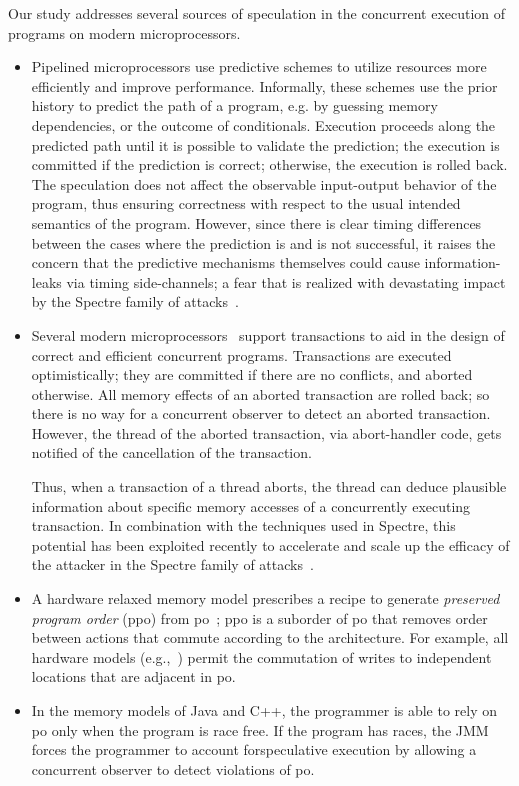 Our study addresses several sources of speculation in the concurrent
execution of programs on modern microprocessors.
\begin{itemize}

\item Pipelined microprocessors use predictive schemes to utilize
  resources more efficiently and improve performance. Informally,
  these schemes use the prior history to predict the path of a
  program, e.g. by guessing memory dependencies, or the outcome of
  conditionals. Execution proceeds along the predicted path until it
  is possible to validate the prediction; the execution is committed
  if the prediction is correct; otherwise, the execution is rolled
  back.  The speculation does not affect the observable input-output
  behavior of the program, thus ensuring correctness with respect to
  the usual intended semantics of the program. However, since there is
  clear timing differences between the cases where the prediction is
  and is not successful, it raises the concern that the predictive
  mechanisms themselves could cause information-leaks via timing
  side-channels; a fear that is realized with devastating impact by
  the Spectre family of attacks~\cite{???}.

\item Several modern microprocessors~\cite{???} support transactions
  to aid in the design of correct and efficient concurrent
  programs. Transactions are executed optimistically; they are
  committed if there are no conflicts, and aborted otherwise. All
  memory effects of an aborted transaction are rolled back; so there
  is no way for a concurrent observer to detect an aborted
  transaction.  However, the thread of the aborted transaction, via
  abort-handler code, gets notified of the cancellation of the
  transaction.

  Thus, when a transaction of a thread aborts, the thread can deduce
  plausible information about specific memory accesses of a
  concurrently executing transaction. In combination with the
  techniques used in Spectre, this potential has been exploited
  recently to accelerate and scale up the efficacy of the attacker in
  the Spectre family of attacks~\cite{???}.

\item A hardware relaxed memory model prescribes a recipe to generate
  \emph{preserved program order} (ppo) from po~\cite{???}; ppo is a
  suborder of po that removes order between actions that commute
  according to the architecture. For example, all hardware models
  (e.g.,~\cite{???}) permit the commutation of writes to independent
  locations that are adjacent in po.

\item In the memory models of Java and C++\cite{???}, the programmer
  is able to rely on po only when the program is race free. If the
  program has races, the JMM forces the programmer to account
  forspeculative execution by allowing a concurrent observer to detect
  violations of po.

\end{itemize}

